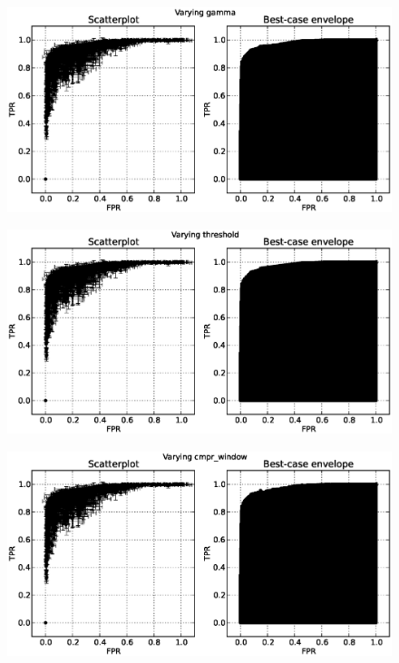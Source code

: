 \begin{figure}[!h]
\begin{center}
\includegraphics[height=2.5in]{../fig/final/scatter_env/gamma}
\includegraphics[height=2.5in]{../fig/final/scatter_env/threshold}
\includegraphics[height=2.5in]{../fig/final/scatter_env/cmpr_window}
\end{center}
\caption{\label{fig:roc_env2}}
\end{figure}

